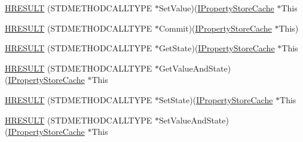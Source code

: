 \begin{DoxyCompactItemize}
\item 
\hyperlink{struct_i_property_store_cache_vtbl_ae3f1ea1dd5c679190ce52b081c419831}{H\+R\+E\+S\+U\+LT} (S\+T\+D\+M\+E\+T\+H\+O\+D\+C\+A\+L\+L\+T\+Y\+PE $\ast$Set\+Value)(\hyperlink{propsys_8h_a0a3e54b7ffa811dc2b6196380447f4e7}{I\+Property\+Store\+Cache} $\ast$This
\item 
\hyperlink{struct_i_property_store_cache_vtbl_ab843a52f1faa39155434f93a88053587}{H\+R\+E\+S\+U\+LT} (S\+T\+D\+M\+E\+T\+H\+O\+D\+C\+A\+L\+L\+T\+Y\+PE $\ast$Commit)(\hyperlink{propsys_8h_a0a3e54b7ffa811dc2b6196380447f4e7}{I\+Property\+Store\+Cache} $\ast$This)
\item 
\hyperlink{struct_i_property_store_cache_vtbl_a2fc60d40109cbe6e80f5d053d3457059}{H\+R\+E\+S\+U\+LT} (S\+T\+D\+M\+E\+T\+H\+O\+D\+C\+A\+L\+L\+T\+Y\+PE $\ast$Get\+State)(\hyperlink{propsys_8h_a0a3e54b7ffa811dc2b6196380447f4e7}{I\+Property\+Store\+Cache} $\ast$This
\item 
\hyperlink{struct_i_property_store_cache_vtbl_adf63e18b5fa43ee34687f33b1d4515b5}{H\+R\+E\+S\+U\+LT} (S\+T\+D\+M\+E\+T\+H\+O\+D\+C\+A\+L\+L\+T\+Y\+PE $\ast$Get\+Value\+And\+State)(\hyperlink{propsys_8h_a0a3e54b7ffa811dc2b6196380447f4e7}{I\+Property\+Store\+Cache} $\ast$This
\item 
\hyperlink{struct_i_property_store_cache_vtbl_aeca3bd738f34fb392b52626ae787969f}{H\+R\+E\+S\+U\+LT} (S\+T\+D\+M\+E\+T\+H\+O\+D\+C\+A\+L\+L\+T\+Y\+PE $\ast$Set\+State)(\hyperlink{propsys_8h_a0a3e54b7ffa811dc2b6196380447f4e7}{I\+Property\+Store\+Cache} $\ast$This
\item 
\hyperlink{struct_i_property_store_cache_vtbl_aac2689cd802b1c9cba4bde60ef8d8fc1}{H\+R\+E\+S\+U\+LT} (S\+T\+D\+M\+E\+T\+H\+O\+D\+C\+A\+L\+L\+T\+Y\+PE $\ast$Set\+Value\+And\+State)(\hyperlink{propsys_8h_a0a3e54b7ffa811dc2b6196380447f4e7}{I\+Property\+Store\+Cache} $\ast$This
\end{DoxyCompactItemize}
